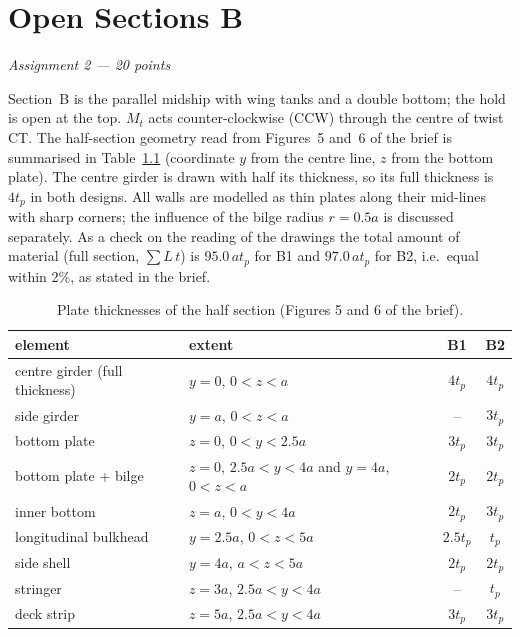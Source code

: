 \chapter{Open Sections B}
\label{ch:assignment2}

\begingroup\itshape Assignment 2 --- 20 points\endgroup

\bigskip
Section~B is the parallel midship with wing tanks and a double bottom; the hold is open at the top. $M_t$ acts counter-clockwise (CCW) through the centre of twist CT. The half-section geometry read from Figures~5 and~6 of the brief is summarised in Table~\ref{tab:B1B2} (coordinate $y$ from the centre line, $z$ from the bottom plate). The centre girder is drawn with half its thickness, so its full thickness is $4t_p$ in both designs. All walls are modelled as thin plates along their mid-lines with sharp corners; the influence of the bilge radius $r=0.5a$ is discussed separately. As a check on the reading of the drawings the total amount of material (full section, $\sum L\,t$) is $95.0\,at_p$ for B1 and $97.0\,at_p$ for B2, i.e.\ equal within 2\%, as stated in the brief.

\begin{table}[htb]
  \centering\small
  \caption{Plate thicknesses of the half section (Figures 5 and 6 of the brief).}
  \label{tab:B1B2}
  \begin{tabular}{llcc}
    \toprule
    element & extent & B1 & B2 \\
    \midrule
    centre girder (full thickness) & $y=0$, $0<z<a$ & $4t_p$ & $4t_p$ \\
    side girder & $y=a$, $0<z<a$ & -- & $3t_p$ \\
    bottom plate & $z=0$, $0<y<2.5a$ & $3t_p$ & $3t_p$ \\
    bottom plate + bilge & $z=0$, $2.5a<y<4a$ and $y=4a$, $0<z<a$ & $2t_p$ & $2t_p$ \\
    inner bottom & $z=a$, $0<y<4a$ & $2t_p$ & $3t_p$ \\
    longitudinal bulkhead & $y=2.5a$, $0<z<5a$ & $2.5t_p$ & $t_p$ \\
    side shell & $y=4a$, $a<z<5a$ & $2t_p$ & $2t_p$ \\
    stringer & $z=3a$, $2.5a<y<4a$ & -- & $t_p$ \\
    deck strip & $z=5a$, $2.5a<y<4a$ & $3t_p$ & $3t_p$ \\
    \bottomrule
  \end{tabular}
\end{table}

